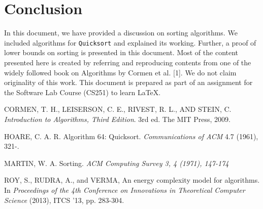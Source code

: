 \documentclass[a4paper, 10pt,twocolumn]{article}
\begin{document}
\section{Conclusion}
In this document, we have provided a discussion on sorting algorithms. We included algorithms for \texttt{Quicksort} and explained its working. Further, a proof of lower bounds on sorting is presented in this
document. Most of the content presented here is created by referring and reproducing contents from one of the widely followed book on Algorithms by Cormen et al. [1]. We do not claim originality of this work. This document is prepared as part of an assignment for the Software Lab Course (CS251) to learn \LaTeX.
\begin{thebibliography}{9}
CORMEN, T. H., LEISERSON, C. E., RIVEST, R. L., AND STEIN, C. 
\textit{Introduction to Algorithms, Third Edition}.
3rd ed. The MIT Press, 2009.

 
HOARE, C. A. R. 
Algorithm 64: Quicksort. \textit{Communications of ACM}
4.7 (1961), 321-.
 
MARTIN, W. A. Sorting. 
\textit{ACM Computing Survey 3, 4 (1971), 147-174}

ROY, S., RUDRA, A., and VERMA,
An energy complexity model for algorithms. In
\textit{Proceedings of the 4th Conference on Innovations in Theoretical Computer Science} (2013), ITCS '13, pp. 283-304.
\end{thebibliography}
\end{document}
